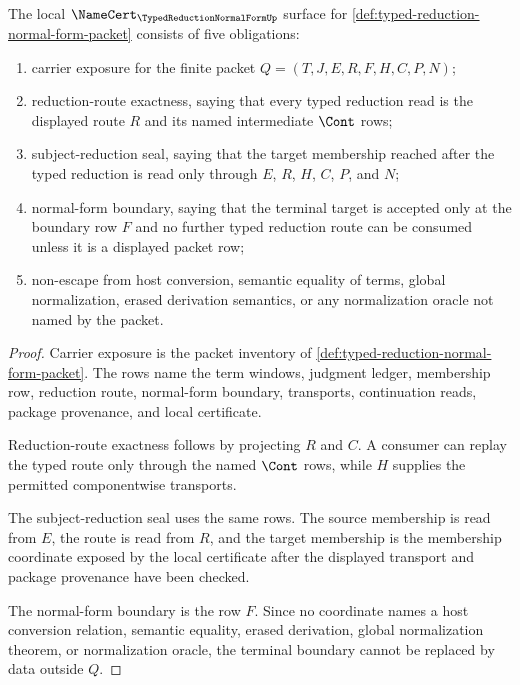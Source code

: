 \begin{theorem}
\label{thm:typed-reduction-normal-form-namecert-obligations}
The local $\NameCert_{\TypedReductionNormalFormUp}$ surface for \autoref{def:typed-reduction-normal-form-packet} consists of five obligations:
\begin{enumerate}
\item carrier exposure for the finite packet $Q=(T,J,E,R,F,H,C,P,N)$;
\item reduction-route exactness, saying that every typed reduction read is the displayed route $R$ and its named intermediate $\Cont$ rows;
\item subject-reduction seal, saying that the target membership reached after the typed reduction is read only through $E$, $R$, $H$, $C$, $P$, and $N$;
\item normal-form boundary, saying that the terminal target is accepted only at the boundary row $F$ and no further typed reduction route can be consumed unless it is a displayed packet row;
\item non-escape from host conversion, semantic equality of terms, global normalization, erased derivation semantics, or any normalization oracle not named by the packet.
\end{enumerate}
\end{theorem}
\begin{proof}
Carrier exposure is the packet inventory of \autoref{def:typed-reduction-normal-form-packet}. The rows name the term windows, judgment ledger, membership row, reduction route, normal-form boundary, transports, continuation reads, package provenance, and local certificate.

Reduction-route exactness follows by projecting $R$ and $C$. A consumer can replay the typed route only through the named $\Cont$ rows, while $H$ supplies the permitted componentwise transports.

The subject-reduction seal uses the same rows. The source membership is read from $E$, the route is read from $R$, and the target membership is the membership coordinate exposed by the local certificate after the displayed transport and package provenance have been checked.

The normal-form boundary is the row $F$. Since no coordinate names a host conversion relation, semantic equality, erased derivation, global normalization theorem, or normalization oracle, the terminal boundary cannot be replaced by data outside $Q$.
\end{proof}

